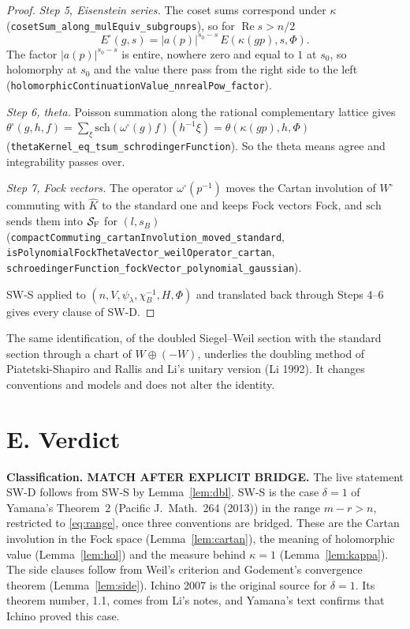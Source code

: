 \documentclass[11pt]{article}
\newcommand{\lean}[1]{\nolinkurl{#1}}
\theoremstyle{definition}
\begin{document}
\begin{proof}
\emph{Step 5, Eisenstein series.} The coset sums correspond under $\kappa$ (\lean{cosetSum_along_mulEquiv_subgroups}), so for $\operatorname{Re}s>n/2$
\[
E^\square(g,s)=|a(p)|^{s_0-s}\,E(\kappa(gp),s,\Phi).
\]
The factor $|a(p)|^{s_0-s}$ is entire, nowhere zero and equal to $1$ at $s_0$, so holomorphy at $s_0$ and the value there pass from the right side to the left (\lean{holomorphicContinuationValue_nnrealPow_factor}).

\emph{Step 6, theta.} Poisson summation along the rational complementary lattice gives $\theta^\square(g,h,f)=\sum_\xi\mathrm{sch}(\omega^\square(g)f)(h^{-1}\xi)=\theta(\kappa(gp),h,\Phi)$ (\lean{thetaKernel_eq_tsum_schrodingerFunction}). So the theta means agree and integrability passes over.

\emph{Step 7, Fock vectors.} The operator $\omega^\square(p^{-1})$ moves the Cartan involution of $W^\square$ commuting with $\widehat K$ to the standard one and keeps Fock vectors Fock, and $\mathrm{sch}$ sends them into $\mathcal S_{\rm F}$ for $(l,s_B)$ (\lean{compactCommuting_cartanInvolution_moved_standard}, \lean{isPolynomialFockThetaVector_weilOperator_cartan}, \lean{schroedingerFunction_fockVector_polynomial_gaussian}).

SW-S applied to $(n,V,\psi_\lambda,\chi_B^{-1},H,\Phi)$ and translated back through Steps 4--6 gives every clause of SW-D.
\end{proof}

The same identification, of the doubled Siegel--Weil section with the standard section through a chart of $W\oplus(-W)$, underlies the doubling method of Piatetski-Shapiro and Rallis and Li's unitary version (Li 1992). It changes conventions and models and does not alter the identity.

\section{E. Verdict}\label{sec:verdict}

\textbf{Classification. MATCH AFTER EXPLICIT BRIDGE.} The live statement SW-D follows from SW-S by Lemma~\ref{lem:dbl}. SW-S is the case $\delta=1$ of Yamana's Theorem~2 (Pacific J.\ Math.\ 264 (2013)) in the range $m-r>n$, restricted to \eqref{eq:range}, once three conventions are bridged. These are the Cartan involution in the Fock space (Lemma~\ref{lem:cartan}), the meaning of holomorphic value (Lemma~\ref{lem:hol}) and the measure behind $\kappa=1$ (Lemma~\ref{lem:kappa}). The side clauses follow from Weil's criterion and Godement's convergence theorem (Lemma~\ref{lem:side}). Ichino 2007 is the original source for $\delta=1$. Its theorem number, 1.1, comes from Li's notes, and Yamana's text confirms that Ichino proved this case.
\end{document}
